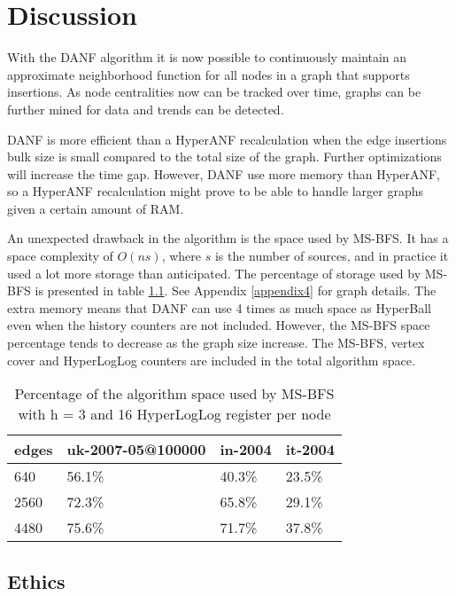 \chapter{Discussion}
With the DANF algorithm it is now possible to continuously maintain an approximate neighborhood function for all nodes in a graph that supports insertions. As node centralities now can be tracked over time, graphs can be further mined for data and trends can be detected. 

DANF is more efficient than a HyperANF recalculation when the edge insertions bulk size is small compared to the total size of the graph. Further optimizations will increase the time gap. However, DANF use more memory than HyperANF, so a HyperANF recalculation might prove to be able to handle larger graphs given a certain amount of RAM. 

An unexpected drawback in the algorithm is the space used by MS-BFS. It has a space complexity of $O(ns)$, where $s$ is the number of sources, and in practice it used a lot more storage than anticipated. The percentage of storage used by MS-BFS is presented in table \ref{table:ms-bfs_space}. See Appendix \ref{appendix4} for graph details. The extra memory means that DANF can use 4 times as much space as HyperBall even when the history counters are not included. However, the MS-BFS space percentage tends to decrease as the graph size increase. The MS-BFS, vertex cover and HyperLogLog counters are included in the total algorithm space.

\begin{table}[h]
    \center
    \begin{tabular}{ | l | l | l | l |}
        \hline
        edges & uk-2007-05@100000 & in-2004 & it-2004 \\ \hline
        640  & 56.1\% & 40.3\% & 23.5\% \\ \hline
        2560 & 72.3\% & 65.8\% & 29.1\% \\ \hline 
        4480 & 75.6\% & 71.7\% & 37.8\% \\
        \hline
    \end{tabular}
    \captionsetup{justification=centering}
    \caption{Percentage of the algorithm space used by MS-BFS with h = 3 and 16 HyperLogLog register per node}
    \label{table:ms-bfs_space}
\end{table}

\section{Ethics}

